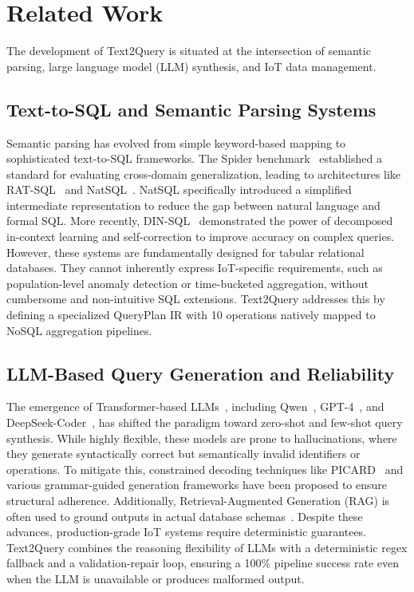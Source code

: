 \documentclass[preprint,12pt,a4paper]{elsarticle}
\begin{document}
\section{Related Work}

The development of Text2Query is situated at the intersection of semantic parsing, large language model (LLM) synthesis, and IoT data management.

\subsection{Text-to-SQL and Semantic Parsing Systems}
Semantic parsing has evolved from simple keyword-based mapping to sophisticated text-to-SQL frameworks. The Spider benchmark~\cite{yu2018spider} established a standard for evaluating cross-domain generalization, leading to architectures like RAT-SQL~\cite{wang2020ratsql} and NatSQL~\cite{gan2021natsql}. NatSQL specifically introduced a simplified intermediate representation to reduce the gap between natural language and formal SQL. More recently, DIN-SQL~\cite{pourreza2024dinsql} demonstrated the power of decomposed in-context learning and self-correction to improve accuracy on complex queries. However, these systems are fundamentally designed for tabular relational databases. They cannot inherently express IoT-specific requirements, such as population-level anomaly detection or time-bucketed aggregation, without cumbersome and non-intuitive SQL extensions. Text2Query addresses this by defining a specialized QueryPlan IR with 10 operations natively mapped to NoSQL aggregation pipelines.

\subsection{LLM-Based Query Generation and Reliability}
The emergence of Transformer-based LLMs~\cite{vaswani2017attention}, including Qwen~\cite{bai2023qwen}, GPT-4~\cite{openai2023gpt4}, and DeepSeek-Coder~\cite{guo2024deepseekcoder}, has shifted the paradigm toward zero-shot and few-shot query synthesis. While highly flexible, these models are prone to hallucinations, where they generate syntactically correct but semantically invalid identifiers or operations. To mitigate this, constrained decoding techniques like PICARD~\cite{scholak2021picard} and various grammar-guided generation frameworks have been proposed to ensure structural adherence. Additionally, Retrieval-Augmented Generation (RAG) is often used to ground outputs in actual database schemas~\cite{rag2024hallucination}. Despite these advances, production-grade IoT systems require deterministic guarantees. Text2Query combines the reasoning flexibility of LLMs with a deterministic regex fallback and a validation-repair loop, ensuring a 100\% pipeline success rate even when the LLM is unavailable or produces malformed output.
\end{document}
